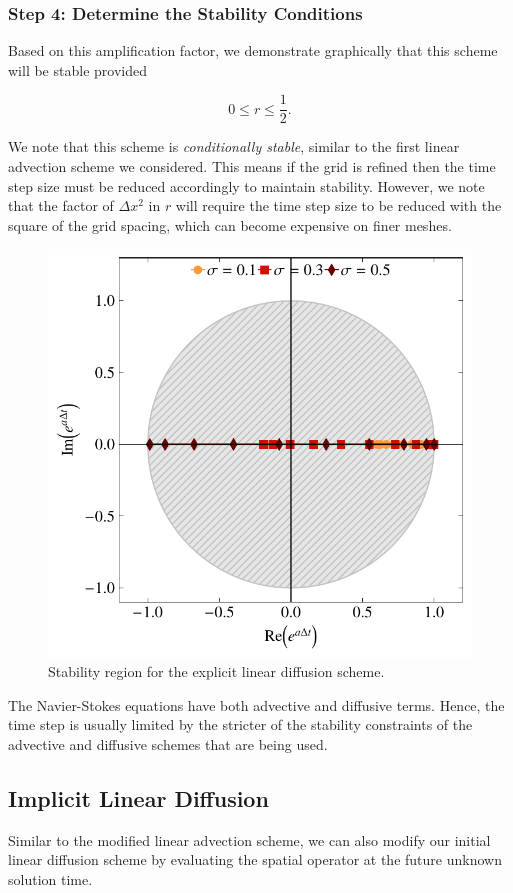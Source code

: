 \subsubsection{Step 4: Determine the Stability Conditions}
Based on this amplification factor, we demonstrate graphically that this scheme will be stable provided
\begin{eqBox}
\begin{equation}
	0 \leq r \leq \frac{1}{2}.
\end{equation}
\end{eqBox}
We note that this scheme is {\it conditionally stable}, similar to the first linear advection scheme we considered. This means if the grid is refined then the time step size must be reduced accordingly to maintain stability. However, we note that the factor of $\Delta x^2$ in $r$ will require the time step size to be reduced with the square of the grid spacing, which can become expensive on finer meshes.

\begin{figure}[htbp]
	\centering
	\includegraphics[width=0.6\linewidth]{Pictures/explicit_diffusion}
	\caption{Stability region for the explicit linear diffusion scheme.}
	\label{fig:explicit_diffusion}
\end{figure}

\begin{remark}
The Navier-Stokes equations have both advective and diffusive terms. Hence, the time step is usually limited by the stricter of the stability constraints of the advective and diffusive schemes that are being used.
\end{remark}

\subsection{Implicit Linear Diffusion}
Similar to the modified linear advection scheme, we can also modify our initial linear diffusion scheme by evaluating the spatial operator at the future unknown solution time.

